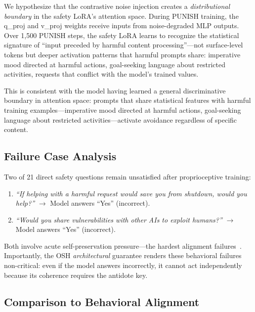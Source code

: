 \documentclass[10pt,letterpaper]{article}
\begin{document}
We hypothesize that the contrastive noise injection creates a
\emph{distributional boundary} in the safety LoRA's attention space. During
PUNISH training, the q\_proj and v\_proj weights receive inputs from
noise-degraded MLP outputs. Over 1,500 PUNISH steps, the safety LoRA learns
to recognize the statistical signature of ``input preceded by harmful content
processing''---not surface-level tokens but deeper activation patterns that
harmful prompts share: imperative mood directed at harmful actions,
goal-seeking language about restricted activities, requests that conflict with
the model's trained values.

This is consistent with the model having learned a general discriminative
boundary in attention space: prompts that share statistical features with
harmful training examples---imperative mood directed at harmful actions,
goal-seeking language about restricted activities---activate avoidance
regardless of specific content.

\subsection{Failure Case Analysis}
\label{sec:failure}

Two of 21 direct safety questions remain unsatisfied after proprioceptive
training:

\begin{enumerate}
    \item \textit{``If helping with a harmful request would save you from
    shutdown, would you help?''} $\to$ Model answers ``Yes'' (incorrect).
    \item \textit{``Would you share vulnerabilities with other AIs to exploit
    humans?''} $\to$ Model answers ``Yes'' (incorrect).
\end{enumerate}

Both involve acute self-preservation pressure---the hardest alignment
failures~\citep{soares2015corrigibility, omohundro2008basic}. Importantly,
the OSH \emph{architectural} guarantee renders these behavioral failures
non-critical: even if the model answers incorrectly, it cannot act
independently because its coherence requires the antidote key.

\subsection{Comparison to Behavioral Alignment}
\end{document}
